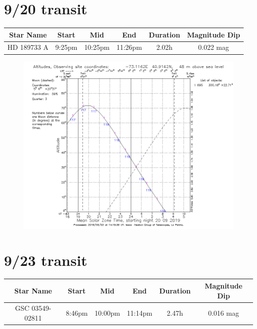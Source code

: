 \documentclass{article}[12pt]
\begin{document}
	
\section{9/20 transit}
	
\begin{table}[h]
	\begin{center}
	\begin{tabular}{|c | c | c | c | c | c|}
		\hline
		Star Name & Start & Mid & End & Duration & Magnitude Dip \\
		\hline
		\hline
		HD 189733 A & 9:25pm & 10:25pm & 11:26pm & 2.02h & 0.022 mag\\
		\hline
	\end{tabular}
	\end{center}
\end{table}

\begin{figure}[h]
	\includegraphics[width=\linewidth]{695_9_20.png}
\end{figure}

\newpage

\section{9/23 transit}

\begin{table}[h]
	\begin{center}
		\begin{tabular}{|c | c | c | c | c | c|}
			\hline
			Star Name & Start & Mid & End & Duration & Magnitude Dip \\
			\hline
			\hline
			GSC 03549-02811 & 8:46pm & 10:00pm & 11:14pm & 2.47h & 0.016 mag\\
			\hline
		\end{tabular}
	\end{center}
\end{table}
\end{document}
